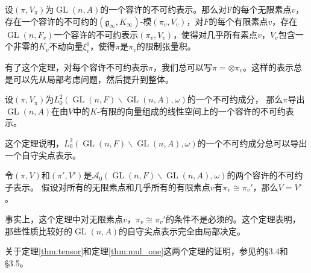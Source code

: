 \begin{theorem}
\label{thm:tensor}
设$(\pi, V_\pi)$为$\operatorname{GL}(n,A)$的一个容许的不可约表示。那么对F的每个无限素点$v$， 存在一个容许的不可约的$(\mathfrak{g}_\infty, K_\infty)$-模$(\pi_v,V_v)$，对$F$的每个有限素点$v$，存在$\operatorname{GL}(n,F_v)$一个容许的不可约表示$(\pi_v,V_v)$，使得对几乎所有素点$v$，$V_v$包含一个非零的$K_v$不动向量$\xi_v^0$，使得$\pi$是$\pi_v$的限制张量积。
\end{theorem}

有了这个定理，对每个容许不可约表示$\pi$，我们总可以写$\pi = \otimes \pi_v$。这样的表示总是可以先从局部考虑问题，然后提升到整体。

\begin{theorem}
设$(\pi, V_\pi)$为$L^2_0\left( \operatorname{GL}(n,F)\backslash \operatorname{GL}(n,A),\omega\right)$的一个不可约成分， 那么$\pi$导出$\operatorname{GL}(n,A)$在由$V$中的$K$-有限的向量组成的线性空间上的一个容许的不可约表示。
\end{theorem}

这个定理说明，$L^2_0\left( \operatorname{GL}(n,F)\backslash \operatorname{GL}(n,A),\omega\right)$的一个不可约成分总可以导出一个自守尖点表示。

\begin{theorem}
\label{thm:mul_one}
令$(\pi, V)$和$(\pi', V')$是$\mathcal{A}_0(\operatorname{GL}(n,F) \backslash \operatorname{GL}(n,A), \omega)$的两个容许的不可约子表示。
假设对所有的无限素点和几乎所有的有限素点$v$有$\pi_v \cong \pi_v'$，那么$V = V'$。
\end{theorem}

事实上，这个定理中对无限素点$v$，$\pi_v \cong \pi_v'$的条件不是必须的。这个定理表明，那些性质比较好的$\operatorname{GL}(n,A)$的自守尖点表示完全由局部决定。

关于定理\ref{thm:tensor}和定理\ref{thm:mul_one}这两个定理的证明，参见的\S3.4和\S3.5。
